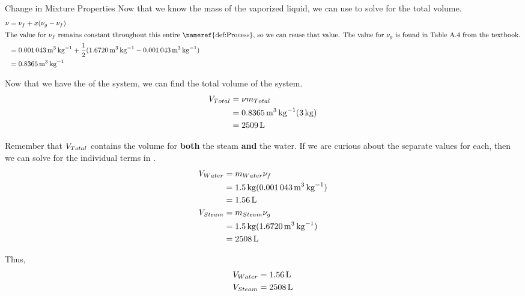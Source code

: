 \begin{example}{Change in Mixture Properties}
  Now that we know the mass of the vaporized liquid, we can use  to solve for the total volume.
  \begin{align*}
    \SpecificVolume &= \Fluid{\SpecificVolume} + \Quality(\Vapor{\SpecificVolume} - \Fluid{\SpecificVolume}) \\
    \intertext{The value for $\Fluid{\SpecificVolume}$ remains constant throughout this entire \nameref{def:Process}, so we can reuse that value. The value for $\Vapor{\SpecificVolume}$ is found in Table A.4 from the textbook.}
                    &= \SI{0.001043}{\meter\cubed\per\kilo\gram} + \frac{1}{2} (\SI{1.6720}{\meter\cubed\per\kilo\gram} - \SI{0.001043}{\meter\cubed\per\kilo\gram}) \\
                    &= \SI{0.8365}{\meter\cubed\per\kilo\gram}
  \end{align*}

  Now that we have the  of the system, we can find the total volume of the system.
  \begin{align*}
    V_{Total} &= \nu m_{Total} \\
                    &= \SI{0.8365}{\meter\cubed\per\kilo\gram} (\SI{3}{\kilo\gram}) \\
                    &= \SI{2509}{\liter}
  \end{align*}

  Remember that $V_{Total}$ contains the volume for \textbf{both} the steam \textbf{and} the water.
  If we are curious about the separate values for each, then we can solve for the individual terms in .
  \begin{align*}
    V_{Water} &= m_{Water} \nu_{f} \\
                    &= \SI{1.5}{\kilo\gram} (\SI{0.001043}{\meter\cubed\per\kilo\gram}) \\
                    &= \SI{1.56}{\liter} \\
    V_{Steam} &= m_{Steam} \nu_{g} \\
                    &= \SI{1.5}{\kilo\gram} (\SI{1.6720}{\meter\cubed\per\kilo\gram}) \\
                    &= \SI{2508}{\liter}
  \end{align*}

  Thus,
  \begin{align*}
    V_{Water} &=  \SI{1.56}{\liter} \\
    V_{Steam} &= \SI{2508}{\liter}
  \end{align*}


\end{example}
